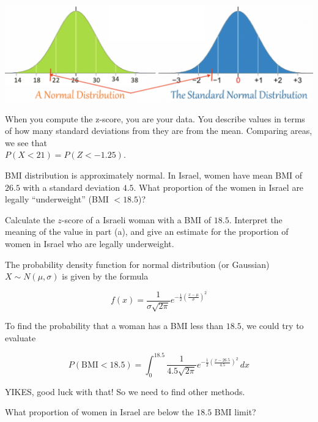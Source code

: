 \begin{center}\includegraphics[width=0.75\tw]{07/07normal-stand.png} \end{center}

When you compute the z-score, you are \textbf{} your data.  You describe values in terms of how many standard deviations from they are from the mean. Comparing areas, we see that \\ $P(X<21) = P(Z<-1.25)$.


\bb[resume]
\ii BMI distribution is approximately normal. In Israel, women have mean BMI of $26.5$ with a standard deviation $4.5$.
What proportion of the women in Israel are legally “underweight” (BMI $< 18.5$)?

\bb
\ii Calculate the $z$-score of a Israeli woman with a BMI of $18.5$. \vfill
\ii Interpret the meaning of the value  in part (a), and give an estimate for the proportion of women in Israel who are legally underweight. \vfill
\ee
\ee

\begin{tcolorbox}
The probability density function for normal distribution (or Gaussian) $X \sim N(\mu,\sigma)$ is given by the formula

\[ f(x) = \frac{1}{\sigma\sqrt{2\pi}} e^{-\frac{1}{2} \left( \frac{x-\mu}{\sigma} \right)^2}\]

To find the probability that a woman has a BMI less than $18.5$, we could try to evaluate

\[ P(\mbox{BMI} < 18.5) = \int_{0}^{18.5} \frac{1}{4.5\sqrt{2\pi}} e^{-\frac{1}{2} \left( \frac{x-26.5}{4.5} \right)^2} \, dx\]

YIKES, good luck with that! So we need to find other methods.
\end{tcolorbox}

\clearpage



\bb[resume]
\ii What proportion of women in Israel are below the $18.5$ BMI limit?
\ee

\vfill

